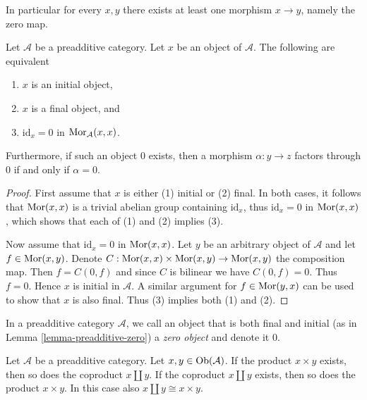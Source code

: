 \noindent
In particular for every $x, y$ there exists at least
one morphism $x \to y$, namely the zero map.

\begin{lemma}
\label{lemma-preadditive-zero}
Let $\mathcal{A}$ be a preadditive category.
Let $x$ be an object of $\mathcal{A}$.
The following are equivalent
\begin{enumerate}
\item $x$ is an initial object,
\item $x$ is a final object, and
\item $\text{id}_x = 0$ in $\mathop{\mathrm{Mor}}\nolimits_\mathcal{A}(x, x)$.
\end{enumerate}
Furthermore, if such an object $0$ exists, then a morphism
$\alpha : y \to z$ factors through $0$ if and only if $\alpha = 0$.
\end{lemma}

\begin{proof}
First assume that $x$ is either (1) initial or (2) final.
In both cases, it follows that $\mathop{\mathrm{Mor}}\nolimits(x,x)$ is a trivial abelian group
containing $\text{id}_x$, thus $\text{id}_x = 0$ in
$\mathop{\mathrm{Mor}}\nolimits(x, x)$, which shows that each of (1) and (2) implies (3).

\medskip\noindent
Now assume that $\text{id}_x = 0$ in $\mathop{\mathrm{Mor}}\nolimits(x,x)$. Let $y$
be an arbitrary object of $\mathcal{A}$ and let $f \in \mathop{\mathrm{Mor}}\nolimits(x ,y)$.
Denote $C : \mathop{\mathrm{Mor}}\nolimits(x,x) \times \mathop{\mathrm{Mor}}\nolimits(x,y) \to \mathop{\mathrm{Mor}}\nolimits(x,y)$ the composition map.
Then $f = C(0, f)$ and since $C$ is bilinear we have $C(0, f) = 0$.
Thus $f = 0$. Hence $x$ is initial in $\mathcal{A}$.
A similar argument for $f \in \mathop{\mathrm{Mor}}\nolimits(y, x)$ can be used to show that
$x$ is also final. Thus (3) implies both (1) and (2).
\end{proof}

\begin{definition}
\label{definition-zero-object}
In a preadditive category $\mathcal{A}$, we call an object that is both
final and initial (as in Lemma \ref{lemma-preadditive-zero}) a
{\it zero object} and denote it $0$.
\end{definition}

\begin{lemma}
\label{lemma-preadditive-direct-sum}
Let $\mathcal{A}$ be a preadditive category.
Let $x, y \in \mathop{\mathrm{Ob}}\nolimits(\mathcal{A})$.
If the product $x \times y$ exists, then so does
the coproduct $x \amalg y$.
If the coproduct $x \amalg y$ exists, then so does
the product $x \times y$. In this case
also $x \amalg y \cong x \times y$.
\end{lemma}

